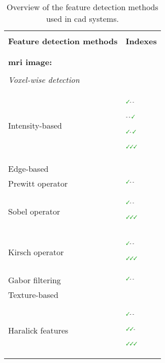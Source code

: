 \thispagestyle{empty}
\begin{table*}
	\centering
	\caption{Overview of the feature detection methods used in \ac{cad} systems.}
	\footnotesize
	\begin{threeparttable}
	\renewcommand{\arraystretch}{.7}
	\begin{tabular}{p{.6\linewidth} p{.3\linewidth}}
		\hline \\ [-1.5ex]
		\textbf{Feature detection methods} & \textbf{Indexes} \\ \\ [-1.5ex]
		\hline \\ [-1.5ex]
		\textbf{\ac{mri} image:} & \\ \\ [-1.5ex]
		\quad \textit{Voxel-wise detection} &  \\ \\ [-1.5ex]
		\quad \quad Intensity-based & $^{\text{{\cmarksmall}- -}}$\cite{Ampeliotis2007,Ampeliotis2008,Vos2008}\par $^{\text{- - {\cmarksmall}}}$\cite{Giannini2013}\par $^{\text{{\cmarksmall}- {\cmarksmall}}}$\cite{Artan2009,Artan2010,Chan2003,Langer2009,Litjens2011,Litjens2012,Litjens2014,Liu2009,Ozer2009,Ozer2010}\par $^{\text{{\cmarksmall}{\cmarksmall}{\cmarksmall}}}$\cite{Niaf2011,Niaf2012} \\ 
		\quad \quad Edge-based & \\
		\quad \quad \quad Prewitt operator & $^{\text{{\cmarksmall}- -}}$\cite{Tiwari2009a,Tiwari2010,Tiwari2013,Viswanath2008} \\
		\quad \quad \quad Sobel operator & $^{\text{{\cmarksmall}- -}}$\cite{Tiwari2009a,Tiwari2010,Tiwari2013,Viswanath2008,Viswanath2009,Viswanath2011,Viswanath2012}\par $^{\text{{\cmarksmall}{\cmarksmall}{\cmarksmall}}}$\cite{Niaf2011,Niaf2012} \\
		\quad \quad \quad Kirsch operator & $^{\text{{\cmarksmall}- -}}$\cite{Tiwari2009a,Tiwari2010,Tiwari2013,Viswanath2008,Viswanath2009,Viswanath2011,Viswanath2012}\par $^{\text{{\cmarksmall}{\cmarksmall}{\cmarksmall}}}$\cite{Niaf2011,Niaf2012} \\
		\quad \quad \quad Gabor filtering & $^{\text{{\cmarksmall}- -}}$\cite{Tiwari2012,Viswanath2008,Viswanath2012} \\ 
		\quad \quad Texture-based & \\
		\quad \quad \quad Haralick features & $^{\text{{\cmarksmall}- -}}$\cite{Antic2013,Tiwari2009a,Tiwari2010,Tiwari2013,Viswanath2008,Viswanath2009,Viswanath2012}\par $^{\text{{\cmarksmall}{\cmarksmall}-}}$\cite{Viswanath2011}\par $^{\text{{\cmarksmall}{\cmarksmall}{\cmarksmall}}}$\cite{Litjens2012,Niaf2011,Niaf2012} \\

\end{tabular}
\end{threeparttable}
\end{table*}
